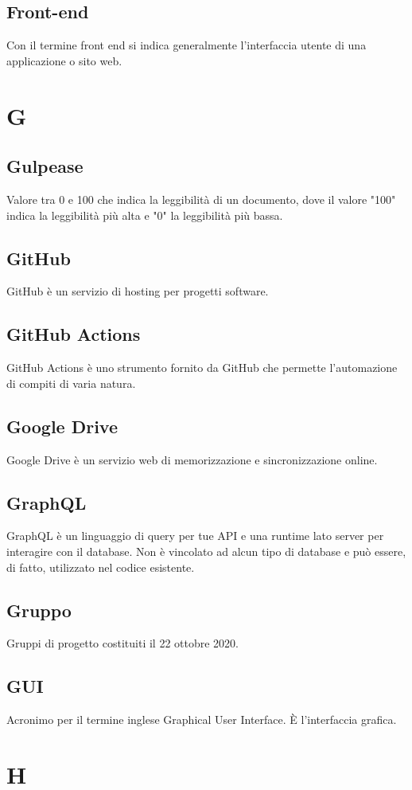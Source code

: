 \subsection{Front-end} Con il termine front end si indica generalmente l’interfaccia utente di una applicazione o sito web.
\newpage \section{G}
\subsection{Gulpease} Valore tra 0 e 100 che indica la leggibilità di un documento, dove il valore "100" indica la leggibilità più alta e "0" la leggibilità più bassa. 
\subsection{GitHub} GitHub è un servizio di hosting per progetti software.
\subsection{GitHub Actions} GitHub Actions è uno strumento fornito da GitHub che permette l’automazione di compiti di varia natura.
\subsection{Google Drive} Google Drive è un servizio web di memorizzazione e sincronizzazione online.
\subsection{GraphQL} GraphQL è un linguaggio di query per tue API e una runtime lato server per interagire con il database. Non è vincolato ad alcun tipo di database e può essere, di fatto, utilizzato nel codice esistente.
\subsection{Gruppo} Gruppi di progetto costituiti il 22 ottobre 2020.
\subsection{GUI} Acronimo per il termine inglese Graphical User Interface. È l'interfaccia grafica.
\newpage \section{H}
